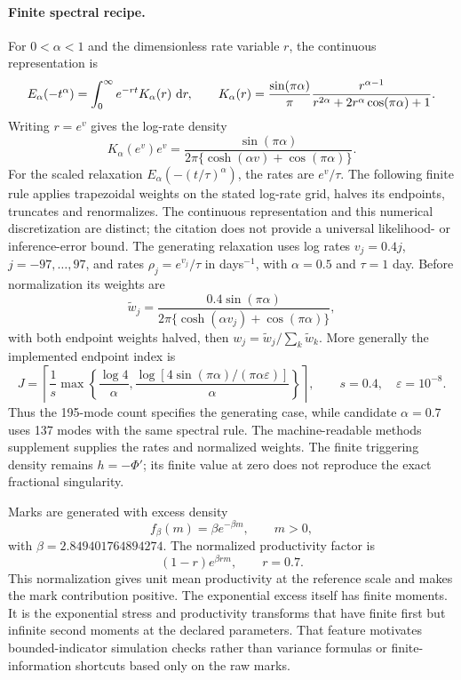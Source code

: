 \paragraph{Finite spectral recipe.}
For \(0<\alpha<1\) and the dimensionless rate variable $r$, the continuous representation
\citep[Eqs.~(2.12)--(2.13)]{Mainardi2014} is
\[
 E_\alpha(-t^\alpha)=\int_0^\infty e^{-rt}K_\alpha(r)\,\mathop{}\!\mathrm{d} r,
 \qquad
 K_\alpha(r)=\frac{\sin(\pi\alpha)}{\pi}
 \frac{r^{\alpha-1}}{r^{2\alpha}+2r^\alpha\cos(\pi\alpha)+1}.
\]
Writing $r=e^v$ gives the log-rate density
\[
 K_\alpha(e^v)e^v=
 \frac{\sin(\pi\alpha)}{2\pi\{\cosh(\alpha v)+\cos(\pi\alpha)\}}.
\]
For the scaled relaxation $E_\alpha(-(t/\tau)^\alpha)$, the rates are
$e^v/\tau$. The following finite rule applies trapezoidal weights on the
stated log-rate grid, halves its endpoints, truncates and renormalizes.
The continuous representation and this numerical discretization are distinct;
the citation does not provide a universal likelihood- or inference-error bound.
The generating relaxation uses log rates \(v_j=0.4j\), \(j=-97,\ldots,97\), and rates \(\rho_j=e^{v_j}/\tau\) in days\(^{-1}\), with \(\alpha=0.5\) and \(\tau=1\) day. Before normalization its weights are
\[
 \widetilde w_j=\frac{0.4\sin(\pi\alpha)}{2\pi\{\cosh(\alpha v_j)+\cos(\pi\alpha)\}},
\]
with both endpoint weights halved, then \(w_j=\widetilde w_j/\sum_k\widetilde w_k\). More generally the implemented endpoint index is
\[
 J=\left\lceil\frac{1}{s}\max\left\{\frac{\log4}{\alpha},
 \frac{\log[4\sin(\pi\alpha)/(\pi\alpha\varepsilon)]}{\alpha}\right\}\right\rceil,
 \qquad s=0.4,\quad\varepsilon=10^{-8}.
\]
Thus the 195-mode count specifies the generating case, while candidate \(\alpha=0.7\) uses 137 modes with the same spectral rule. The machine-readable methods supplement supplies the rates and normalized weights. The finite triggering density remains \(h=-\Phi'\); its finite value at zero does not reproduce the exact fractional singularity.


Marks are generated with excess density
\[
f_\beta(m)=\beta e^{-\beta m},\qquad m>0,
\]
with \(\beta=2.849401764894274\). The normalized productivity factor is
\[
(1-r)e^{\beta r m},\qquad r=0.7.
\]
This normalization gives unit mean productivity at the reference scale and makes the mark contribution positive. The exponential excess itself has finite moments. It is the exponential stress and productivity transforms that have finite first but infinite second moments at the declared parameters. That feature motivates bounded-indicator simulation checks rather than variance formulas or finite-information shortcuts based only on the raw marks.

